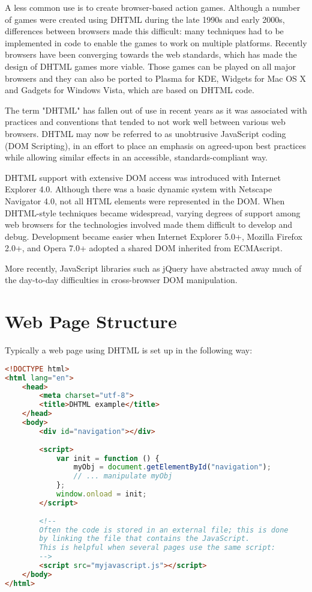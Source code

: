 A less common use is to create browser-based action games. Although a number of games were created using DHTML during the late 1990s and early 2000s, differences between browsers made this difficult: many techniques had to be implemented in code to enable the games to work on multiple platforms. Recently browsers have been converging towards the web standards, which has made the design of DHTML games more viable. Those games can be played on all major browsers and they can also be ported to Plasma for KDE, Widgets for Mac OS X and Gadgets for Windows Vista, which are based on DHTML code.

The term "DHTML" has fallen out of use in recent years as it was associated with practices and conventions that tended to not work well between various web browsers. DHTML may now be referred to as unobtrusive JavaScript coding (DOM Scripting), in an effort to place an emphasis on agreed-upon best practices while allowing similar effects in an accessible, standards-compliant way.


DHTML support with extensive DOM access was introduced with Internet Explorer 4.0. Although there was a basic dynamic system with Netscape Navigator 4.0, not all HTML elements were represented in the DOM. When DHTML-style techniques became widespread, varying degrees of support among web browsers for the technologies involved made them difficult to develop and debug. Development became easier when Internet Explorer 5.0+, Mozilla Firefox 2.0+, and Opera 7.0+ adopted a shared DOM inherited from ECMAscript.


More recently, JavaScript libraries such as jQuery have abstracted away much of the day-to-day difficulties in cross-browser DOM manipulation.



\chapter{Web Page Structure}

Typically a web page using DHTML is set up in the following way:


\begin{lstlisting}[language=HTML]
<!DOCTYPE html>
<html lang="en">
    <head>
        <meta charset="utf-8">
        <title>DHTML example</title>
    </head>
    <body>
        <div id="navigation"></div>
 
        <script>
            var init = function () {
                myObj = document.getElementById("navigation");
                // ... manipulate myObj
            };
            window.onload = init;
        </script>
 
        <!--
        Often the code is stored in an external file; this is done
        by linking the file that contains the JavaScript.
        This is helpful when several pages use the same script:
        -->
        <script src="myjavascript.js"></script>
    </body>
</html>
\end{lstlisting}



